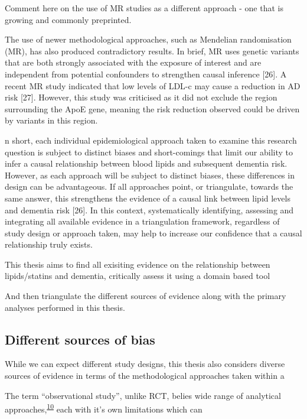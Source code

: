 \documentclass[a4paper, twoside]{templates/ociamthesis}
\begin{document}
Comment here on the use of MR studies as a different approach - one that is growing and commonly preprinted.

The use of newer methodological approaches, such as Mendelian randomisation (MR), has also produced contradictory results. In brief, MR uses genetic variants that are both strongly associated with the exposure of interest and are independent from potential confounders to strengthen causal inference {[}26{]}. A recent MR study indicated that low levels of LDL-c may cause a reduction in AD risk {[}27{]}. However, this study was criticised as it did not exclude the region surrounding the ApoE gene, meaning the risk reduction observed could be driven by variants in this region.

n short, each individual epidemiological approach taken to examine this research question is subject to distinct biases and short-comings that limit our ability to infer a causal relationship between blood lipids and subsequent dementia risk. However, as each approach will be subject to distinct biases, these differences in design can be advantageous. If all approaches point, or triangulate, towards the same answer, this strengthens the evidence of a causal link between lipid levels and dementia risk {[}26{]}. In this context, systematically identifying, assessing and integrating all available evidence in a triangulation framework, regardless of study design or approach taken, may help to increase our confidence that a causal relationship truly exists.

This thesis aims to find all exisiting evidence on the relationship between lipids/statins and dementia, critically assess it using a domain based tool

And then triangulate the different sources of evidence along with the primary analyses performed in this thesis.

\hypertarget{different-sources-of-bias}{%
\subsection{Different sources of bias}\label{different-sources-of-bias}}

While we can expect different study designs, this thesis also considers diverse sources of evidence in terms of the methodological approaches taken within a

The term ``observational study'', unlike RCT, belies wide range of analytical approaches,\textsuperscript{\protect\hyperlink{ref-thiese2014}{10}} each with it's own limitations which can
\end{document}
